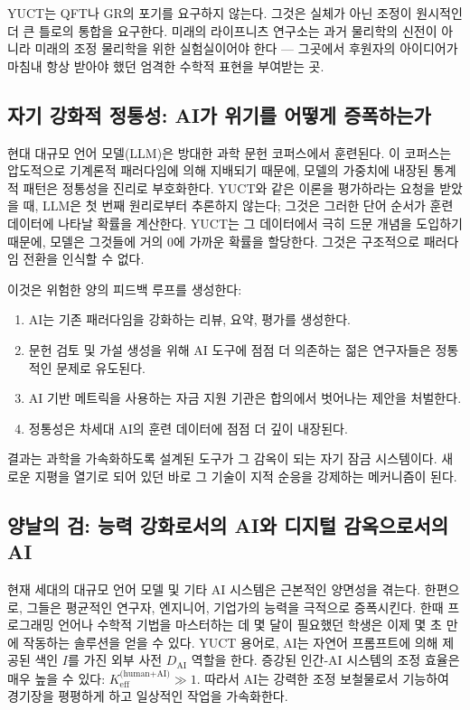 \documentclass[12pt,a4paper]{article}
\begin{document}
	YUCT는 QFT나 GR의 포기를 요구하지 않는다. 그것은 실체가 아닌 조정이 원시적인 더 큰 틀로의 통합을 요구한다. 미래의 라이프니츠 연구소는 과거 물리학의 신전이 아니라 미래의 조정 물리학을 위한 실험실이어야 한다 — 그곳에서 후원자의 아이디어가 마침내 항상 받아야 했던 엄격한 수학적 표현을 부여받는 곳.
	
	\subsection{자기 강화적 정통성: AI가 위기를 어떻게 증폭하는가}
	
	현대 대규모 언어 모델(LLM)은 방대한 과학 문헌 코퍼스에서 훈련된다. 이 코퍼스는 압도적으로 기계론적 패러다임에 의해 지배되기 때문에, 모델의 가중치에 내장된 통계적 패턴은 정통성을 진리로 부호화한다. YUCT와 같은 이론을 평가하라는 요청을 받았을 때, LLM은 첫 번째 원리로부터 추론하지 않는다; 그것은 그러한 단어 순서가 훈련 데이터에 나타날 확률을 계산한다. YUCT는 그 데이터에서 극히 드문 개념을 도입하기 때문에, 모델은 그것들에 거의 0에 가까운 확률을 할당한다. 그것은 구조적으로 패러다임 전환을 인식할 수 없다.
	
	이것은 위험한 양의 피드백 루프를 생성한다:
	\begin{enumerate}
		\item AI는 기존 패러다임을 강화하는 리뷰, 요약, 평가를 생성한다.
		\item 문헌 검토 및 가설 생성을 위해 AI 도구에 점점 더 의존하는 젊은 연구자들은 정통적인 문제로 유도된다.
		\item AI 기반 메트릭을 사용하는 자금 지원 기관은 합의에서 벗어나는 제안을 처벌한다.
		\item 정통성은 차세대 AI의 훈련 데이터에 점점 더 깊이 내장된다.
	\end{enumerate}
	결과는 과학을 가속화하도록 설계된 도구가 그 감옥이 되는 자기 잠금 시스템이다. 새로운 지평을 열기로 되어 있던 바로 그 기술이 지적 순응을 강제하는 메커니즘이 된다.
	
	\subsection{양날의 검: 능력 강화로서의 AI와 디지털 감옥으로서의 AI}
	
	현재 세대의 대규모 언어 모델 및 기타 AI 시스템은 근본적인 양면성을 겪는다. 한편으로, 그들은 평균적인 연구자, 엔지니어, 기업가의 능력을 극적으로 증폭시킨다. 한때 프로그래밍 언어나 수학적 기법을 마스터하는 데 몇 달이 필요했던 학생은 이제 몇 초 만에 작동하는 솔루션을 얻을 수 있다. YUCT 용어로, AI는 자연어 프롬프트에 의해 제공된 색인 \(I\)를 가진 외부 사전 \(D_{\text{AI}}\) 역할을 한다. 증강된 인간-AI 시스템의 조정 효율은 매우 높을 수 있다: \(K_{\mathrm{eff}}^{\text{(human+AI)}} \gg 1\). 따라서 AI는 강력한 조정 보철물로서 기능하여 경기장을 평평하게 하고 일상적인 작업을 가속화한다.
	
\end{document}
